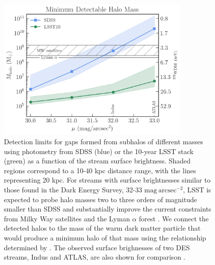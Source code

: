 \documentclass[modern,linenumbers]{aastex62}
\begin{document}
\begin{figure}
\centering
\includegraphics[width=0.85\textwidth]{figures/streamgap_constraint_2.png}
\caption{Detection limits for gaps formed from subhalos of different masses using photometry from SDSS (blue) or the 10-year LSST stack (green) as a function of the stream surface brightness. Shaded regions correspond to a 10-40 kpc distance range, with the lines representing 20 kpc. For streams with surface brightnesses similar to those found in the Dark Energy Survey, 32-33 $\mathrm{mag}\ \mathrm{arcsec}^{-2}$, LSST is expected to probe halo masses two to three orders of magnitude smaller than SDSS and substantially improve the current constraints from Milky Way satellites \citep{Nadler:2018, Jethwa:2018} and the Lyman $\alpha$ forest \citep{2017PhRvD..96b3522I}. We connect the detected halos to the mass of the warm dark matter particle that would produce a minimum halo of that mass using the relationship determined by \cite{Bullock:2017xww}. The observed surface brighnesses of two DES streams, Indus and ATLAS, are also shown for comparison \citep{2018ApJ...862..114S}. \label{fig:streamsurveys}}
\end{figure}
\end{document}
